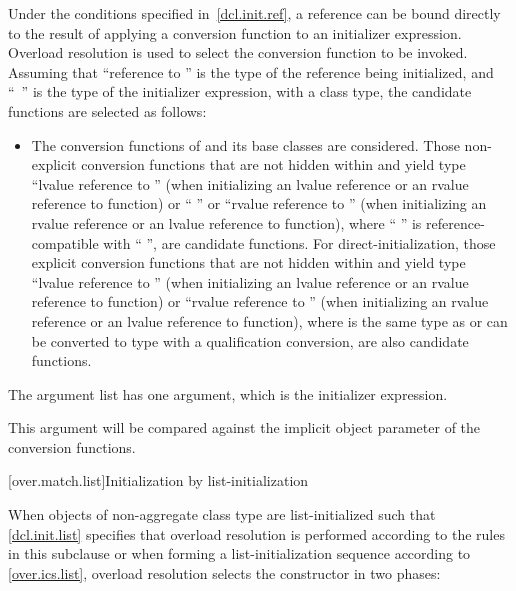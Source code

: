 \pnum
Under the conditions specified in~\ref{dcl.init.ref}, a reference can be bound directly
to the result of applying a conversion
function to an initializer expression.
Overload resolution is used to select the
conversion function to be invoked.
Assuming that ``reference to  '' is the
type of the reference being initialized, and
``\cv{}~'' is the type
of the initializer expression, with
a class type,
the candidate functions are selected as follows:
\begin{itemize}
\item
The conversion functions of
and its base classes are considered.
Those non-explicit conversion functions that are not hidden within
and yield type ``lvalue reference to  ''
(when initializing an lvalue reference or an rvalue reference to function) or
`` ''
or ``rvalue reference to  '' (when initializing an
rvalue reference or an lvalue reference to function),
where `` '' is reference-compatible
with `` '',
are candidate functions. For direct-initialization, those explicit
conversion functions that are not hidden within  and yield
type ``lvalue reference to  ''
(when initializing an lvalue reference or an rvalue reference to function)
or ``rvalue reference to  ''
(when initializing an rvalue reference or an lvalue reference to function),
where  is the same type as  or can be
converted to type  with a qualification
conversion, are also candidate functions.

\end{itemize}

\pnum
The argument list has one argument, which is the initializer expression.
\begin{note}
This argument will be compared against
the implicit object parameter of the conversion functions.
\end{note}

[over.match.list]{Initialization by list-initialization}%

\pnum
When objects of non-aggregate class type  are
list-initialized such that \ref{dcl.init.list} specifies that overload resolution
is performed according to the rules in this subclause
or when forming a list-initialization sequence according to \ref{over.ics.list},
overload resolution selects the constructor in two phases:

